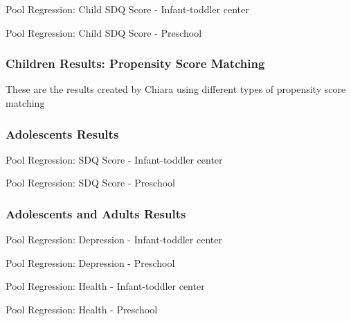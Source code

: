 \begin{table}[H]
\begin{table}[H]
\begin{table}[H]
\begin{table}[H]
\begin{table}[H]
\begin{table}[H]
\begin{small}
\begin{table}[H]
\caption{Pool Regression: Child SDQ Score - Infant-toddler center}
  
\end{table}
\begin{table}[H]
\caption{Pool Regression: Child SDQ Score - Preschool}

\end{table}
\end{small}

\pagebreak
\subsubsection{Children Results: Propensity Score Matching}
These are the results created by Chiara using different types of propensity score matching
\begin{small}

\end{small}

\pagebreak
\subsubsection{Adolescents Results}

\begin{table}[H]
\caption{Pool Regression: SDQ Score - Infant-toddler center}

\end{table}
\begin{table}[H]
\caption{Pool Regression: SDQ Score - Preschool}

\end{table}


\pagebreak
\subsubsection{Adolescents and Adults Results}
\begin{table}[H]
\caption{Pool Regression: Depression - Infant-toddler center}

\end{table}
\begin{table}[H]
\caption{Pool Regression: Depression - Preschool}

\end{table}

\begin{table}[H]
\caption{Pool Regression: Health - Infant-toddler center}

\end{table}
\begin{table}[H]
\caption{Pool Regression: Health - Preschool}

\end{table}


\end{table}
\end{table}
\end{table}
\end{table}
\end{table}
\end{table}
